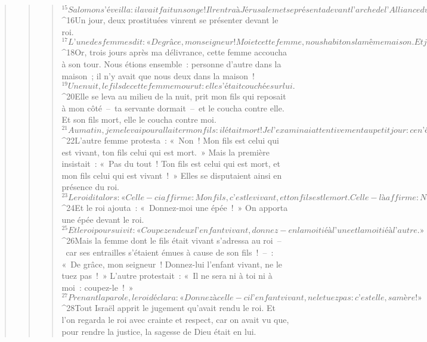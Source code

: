 \begin{verse}
\begin{verse}
\begin{verse}
${}^{15}Salomon s’éveilla : il avait fait un songe ! Il rentra à Jérusalem et se présenta devant l’arche de l’Alliance du Seigneur. Il offrit des holocaustes et des sacrifices de paix, et donna un festin à tous ses serviteurs.
${}^{16}Un jour, deux prostituées vinrent se présenter devant le roi. 
${}^{17} L’une des femmes dit : « De grâce, mon seigneur ! Moi et cette femme, nous habitons la même maison. Et j’ai accouché, alors qu’elle était à la maison. 
${}^{18}Or, trois jours après ma délivrance, cette femme accoucha à son tour. Nous étions ensemble : personne d’autre dans la maison ; il n’y avait que nous deux dans la maison ! 
${}^{19}Une nuit, le fils de cette femme mourut : elle s’était couchée sur lui. 
${}^{20}Elle se leva au milieu de la nuit, prit mon fils qui reposait à mon côté – ta servante dormait – et le coucha contre elle. Et son fils mort, elle le coucha contre moi. 
${}^{21}Au matin, je me levai pour allaiter mon fils : il était mort ! Je l’examinai attentivement au petit jour : ce n’était pas mon fils, celui que j’avais mis au monde. » 
${}^{22}L’autre femme protesta : « Non ! Mon fils est celui qui est vivant, ton fils celui qui est mort. » Mais la première insistait : « Pas du tout ! Ton fils est celui qui est mort, et mon fils celui qui est vivant ! » Elles se disputaient ainsi en présence du roi. 
${}^{23}Le roi dit alors : « Celle-ci affirme : Mon fils, c’est le vivant, et ton fils est le mort. Celle-là affirme : Non ! Ton fils, c’est le mort, et mon fils est le vivant ! » 
${}^{24}Et le roi ajouta : « Donnez-moi une épée ! » On apporta une épée devant le roi. 
${}^{25}Et le roi poursuivit : « Coupez en deux l’enfant vivant, donnez-en la moitié à l’une et la moitié à l’autre. » 
${}^{26}Mais la femme dont le fils était vivant s’adressa au roi – car ses entrailles s’étaient émues à cause de son fils ! – : « De grâce, mon seigneur ! Donnez-lui l’enfant vivant, ne le tuez pas ! » L’autre protestait : « Il ne sera ni à toi ni à moi : coupez-le ! » 
${}^{27}Prenant la parole, le roi déclara : « Donnez à celle-ci l’enfant vivant, ne le tuez pas : c’est elle, sa mère ! » 
${}^{28}Tout Israël apprit le jugement qu’avait rendu le roi. Et l’on regarda le roi avec crainte et respect, car on avait vu que, pour rendre la justice, la sagesse de Dieu était en lui.
      

\end{verse}
\end{verse}
\end{verse}
